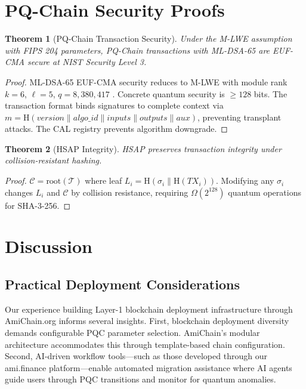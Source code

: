 \documentclass[12pt, a4paper, twocolumn]{article}
\newtheorem{theorem}{Theorem}
\begin{document}
\section{PQ-Chain Security Proofs}
\label{sec:security}

\begin{theorem}[PQ-Chain Transaction Security]
Under the M-LWE assumption with FIPS 204 parameters, PQ-Chain transactions with ML-DSA-65 are EUF-CMA secure at NIST Security Level 3.
\end{theorem}

\begin{proof}
ML-DSA-65 EUF-CMA security reduces to M-LWE with module rank $k=6$, $\ell=5$, $q=8{,}380{,}417$ \cite{ducas2018crystals}. Concrete quantum security is $\geq 128$ bits. The transaction format binds signatures to complete context via $m = \text{H}(\mathit{version} \| \mathit{algo\_id} \| \mathit{inputs} \| \mathit{outputs} \| \mathit{aux})$, preventing transplant attacks. The CAL registry prevents algorithm downgrade.
\end{proof}

\begin{theorem}[HSAP Integrity]
HSAP preserves transaction integrity under collision-resistant hashing.
\end{theorem}

\begin{proof}
$\mathcal{C} = \text{root}(\mathcal{T})$ where leaf $L_i = \text{H}(\sigma_i \| \text{H}(TX_i))$. Modifying any $\sigma_i$ changes $L_i$ and $\mathcal{C}$ by collision resistance, requiring $\Omega(2^{128})$ quantum operations for SHA-3-256.
\end{proof}

\section{Discussion}
\label{sec:discussion}

\subsection{Practical Deployment Considerations}

Our experience building Layer-1 blockchain deployment infrastructure through AmiChain.org informs several insights. First, blockchain deployment diversity demands configurable PQC parameter selection. AmiChain's modular architecture accommodates this through template-based chain configuration. Second, AI-driven workflow tools---such as those developed through our ami.finance platform---enable automated migration assistance where AI agents guide users through PQC transitions and monitor for quantum anomalies.
\end{document}

